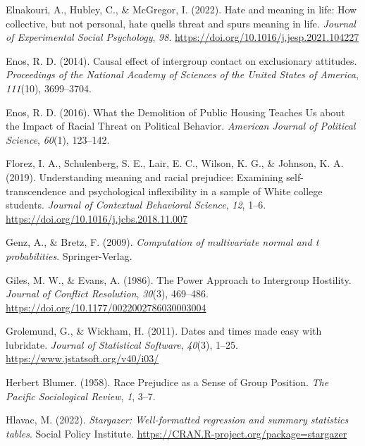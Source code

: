 \documentclass[
  man,floatsintext]{apa7}
\newlength{\cslhangindent}
\newlength{\cslentryspacingunit} %
\newenvironment{CSLReferences}[2] %
 {%
  \setlength{\parindent}{0pt}
  \ifodd #1
  \let\oldpar\par
  \def\par{\hangindent=\cslhangindent\oldpar}
  \fi
  \setlength{\parskip}{#2\cslentryspacingunit}
 }%
 {}
\begin{document}
\begin{CSLReferences}{1}{0}
\leavevmode{}%
Elnakouri, A., Hubley, C., \& McGregor, I. (2022). Hate and meaning in life: {How} collective, but not personal, hate quells threat and spurs meaning in life. \emph{Journal of Experimental Social Psychology}, \emph{98}. \url{https://doi.org/10.1016/j.jesp.2021.104227}

\leavevmode{}%
Enos, R. D. (2014). Causal effect of intergroup contact on exclusionary attitudes. \emph{Proceedings of the National Academy of Sciences of the United States of America}, \emph{111}(10), 3699--3704.

\leavevmode{}%
Enos, R. D. (2016). What the {Demolition} of {Public Housing Teaches Us} about the {Impact} of {Racial Threat} on {Political Behavior}. \emph{American Journal of Political Science}, \emph{60}(1), 123--142.

\leavevmode{}%
Florez, I. A., Schulenberg, S. E., Lair, E. C., Wilson, K. G., \& Johnson, K. A. (2019). Understanding meaning and racial prejudice: {Examining} self-transcendence and psychological inflexibility in a sample of {White} college students. \emph{Journal of Contextual Behavioral Science}, \emph{12}, 1--6. \url{https://doi.org/10.1016/j.jcbs.2018.11.007}

\leavevmode{}%
Genz, A., \& Bretz, F. (2009). \emph{Computation of multivariate normal and t probabilities}. Springer-Verlag.

\leavevmode{}%
Giles, M. W., \& Evans, A. (1986). The {Power Approach} to {Intergroup Hostility}. \emph{Journal of Conflict Resolution}, \emph{30}(3), 469--486. \url{https://doi.org/10.1177/0022002786030003004}

\leavevmode{}%
Grolemund, G., \& Wickham, H. (2011). Dates and times made easy with {lubridate}. \emph{Journal of Statistical Software}, \emph{40}(3), 1--25. \url{https://www.jstatsoft.org/v40/i03/}

\leavevmode{}%
Herbert Blumer. (1958). Race {Prejudice} as a {Sense} of {Group Position}. \emph{The Pacific Sociological Review}, \emph{1}, 3--7.

\leavevmode{}%
Hlavac, M. (2022). \emph{Stargazer: Well-formatted regression and summary statistics tables}. Social Policy Institute. \url{https://CRAN.R-project.org/package=stargazer}


\end{CSLReferences}
\end{document}
